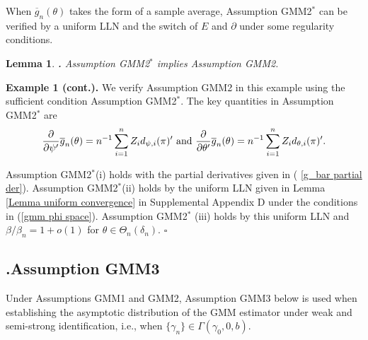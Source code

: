 \documentclass[12pt,titlepage,final,oneside,letterpaper]{article}
\newtheorem{lemma}{Lemma}[section]
\begin{document}
When $\overline{g}_{n}(\theta )$ takes the form of a sample average,
Assumption GMM2$^{\ast }$ can be verified by a uniform LLN and the switch of 
$E$ and $\partial $ under some regularity conditions.\medskip

\begin{lemma}
\hspace{-0.08in}\textbf{.} \label{Lemma GMM Smooth Sufficient}Assumption 
\emph{GMM2}$^{\ast }$ implies Assumption \emph{GMM2.}
\end{lemma}

\noindent \textbf{Example 1 (cont.). }We verify Assumption GMM2 in this
example using the sufficient condition Assumption GMM2$^{\ast }.$ The key
quantities in Assumption GMM2$^{\ast }$ are%
\begin{equation}
\frac{\partial }{\partial \psi ^{\prime }}\overline{g}_{n}(\theta
)=n^{-1}\sum_{i=1}^{n}Z_{i}d_{\psi ,i}(\pi )^{\prime }\text{ and }\frac{%
\partial }{\partial \theta ^{\prime }}\overline{g}_{n}(\theta
)=n^{-1}\sum_{i=1}^{n}Z_{i}d_{\theta ,i}(\pi )^{\prime }.
\label{g_bar  partial der}
\end{equation}

Assumption GMM2$^{\ast }$(i) holds with the partial derivatives given in (%
\ref{g_bar partial der}). Assumption GMM2$^{\ast }$(ii) holds by the uniform
LLN given in Lemma \ref{Lemma uniform convergence} in Supplemental Appendix
D under the conditions in (\ref{gmm phi space}). Assumption GMM2$^{\ast }$%
(iii) holds by this uniform LLN and $\beta /\beta _{n}=1+o(1)$ for $\theta
\in \Theta _{n}(\delta _{n}).$ $\square $

\subsection{\hspace{-0.23in}\textbf{.}\hspace{0.18in}Assumption GMM3}

\hspace{0.25in}Under Assumptions GMM1 and GMM2, Assumption GMM3 below is
used when establishing the asymptotic distribution of the GMM estimator
under weak and semi-strong identification, i.e., when $\{\gamma _{n}\}\in
\Gamma (\gamma _{0},0,b).$
\end{document}
